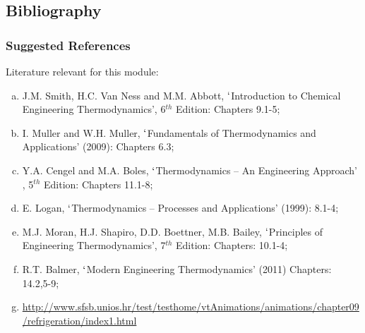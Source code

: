 \documentclass[10pt,compress]{beamer}
\begin{document}
\subsection{Bibliography} 
\begin{frame}
 \frametitle{Suggested References}
  Literature relevant for this module:
  \begin{enumerate}[(a)]
   \item J.M. Smith, H.C. Van Ness and M.M. Abbott, $\lq$Introduction to Chemical Engineering Thermodynamics', 6$^{th}$ Edition: Chapters 9.1-5;
   \item I. Muller and W.H. Muller, $\lq$Fundamentals of Thermodynamics and Applications' (2009): Chapters 6.3;
   \item Y.A. Cengel and M.A. Boles, $\lq$Thermodynamics -- An Engineering Approach' , 5$^{th}$ Edition: Chapters 11.1-8;
   \item E. Logan, $\lq$Thermodynamics -- Processes and Applications' (1999): 8.1-4;
   \item M.J. Moran, H.J. Shapiro, D.D. Boettner, M.B. Bailey, $\lq$Principles of Engineering Thermodynamics', 7$^{th}$ Edition: Chapters: 10.1-4;
   \item R.T. Balmer, $\lq$Modern Engineering Thermodynamics' (2011) Chapters: 14.2,5-9;
   \item \href{http://www.sfsb.unios.hr/test/testhome/vtAnimations/animations/chapter09/refrigeration/index1.html}{\scriptsize{http://www.sfsb.unios.hr/test/testhome/vtAnimations/animations/chapter09/refrigeration/index1.html}}
  \end{enumerate}
\end{frame}
\end{document}
